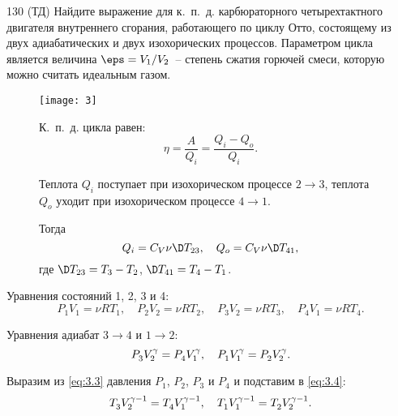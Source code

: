 \documentclass[pscyr]{hedwork}
\newcommand{\vg}{{\vphantom{\gamma}}}
\begin{document}
  \begin{task}{130 (ТД)}{
    Найдите выражение для к.~п.~д. карбюраторного четырехтактного двигателя
    внутреннего сгорания, работающего по циклу Отто, состоящему из двух
    адиабатических и двух изохорических процессов. Параметром цикла является
    величина \( \eps = V_1 / V_2 \)~-- степень сжатия горючей смеси, которую
    можно считать идеальным газом.
  }

    \begin{figure}[h!]
      \center
      \begin{minipage}{.38\textwidth}
        \texttt{[image: 3]}
      \end{minipage} \hfill
      \begin{minipage}{.6\textwidth}
        К.~п.~д. цикла равен:
        \begin{equation}
          \eta = \frac{A}{Q_i} = \frac{Q_i - Q_o}{Q_i}.
          \label{eq:3.1}
        \end{equation}

        Теплота \( Q_i \) поступает при изохорическом процессе \( 2 \to 3 \),
        теплота \( Q_o \) уходит при изохорическом процессе \( 4 \to 1 \).

        Тогда
        \begin{equation}
          Q_i = C_V\nu\D T_{23}, \quad Q_o = C_V\nu\D T_{41},
          \label{eq:3.2}
        \end{equation}
        где \( \D T_{23} = T_3 - T_2 \), \( \D T_{41} = T_4 - T_1 \).
      \end{minipage}
    \end{figure}

    Уравнения состояний 1, 2, 3 и 4:
    \begin{equation}
      P_1 V_1 = \nu RT_1, \quad P_2 V_2 = \nu RT_2, \quad
        P_3 V_2 = \nu RT_3, \quad P_4 V_1 = \nu RT_4.
      \label{eq:3.3}
    \end{equation}

    Уравнения адиабат \( 3 \to 4 \) и \( 1 \to 2 \):
    \begin{equation}
      P_3^\vg V_2^\gamma = P_4^\vg V_1^\gamma, \quad
        P_1^\vg V_1^\gamma = P_2^\vg V_2^\gamma.
      \label{eq:3.4}
    \end{equation}

    Выразим из \eqref{eq:3.3} давления \( P_1 \), \( P_2 \), \( P_3 \) и
    \( P_4 \) и подставим в \eqref{eq:3.4}:
    \[
      T_3^\vg V_2^{\gamma - 1} = T_4^\vg V_1^{\gamma - 1}, \quad
        T_1^\vg V_1^{\gamma - 1} = T_2^\vg V_2^{\gamma - 1}.
    \]


\end{task}
\end{document}
